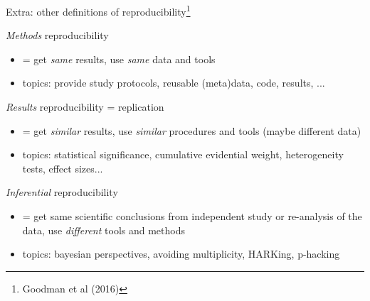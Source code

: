 \documentclass[10pt,aspectratio=169]{beamer}
\begin{document}
\begin{frame}{Extra: other definitions of reproducibility\footnote{Goodman et al (2016)}}
\small{
    \begin{Block}{\textit{Methods} reproducibility}
        \begin{itemize}
            \item = get \textit{same} results, use \textit{same} data and tools
            \item topics: provide study protocols, reusable (meta)data, code,
              results, ...
        \end{itemize}
    \end{Block}
    \begin{Block}{\textit{Results} reproducibility = replication}
        \begin{itemize}
            \item = get \textit{similar} results, use \textit{similar}
              procedures and tools (maybe different data)
            \item topics: statistical significance, cumulative evidential
              weight, heterogeneity tests, effect sizes...
        \end{itemize}
    \end{Block}
    \begin{Block}{\textit{Inferential} reproducibility}
        \begin{itemize}
            \item = get same scientific conclusions from independent study or
              re-analysis of the data, use \textit{different} tools and methods
            \item topics: bayesian perspectives, avoiding multiplicity, HARKing,
              p-hacking
        \end{itemize}
    \end{Block}
}
\end{frame}

\setcounter{framenumber}{\value{finalframe}}
\end{document}
